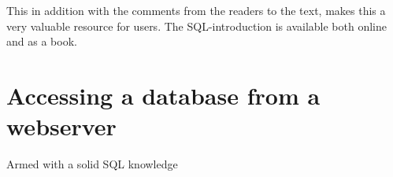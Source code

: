 This in addition with the comments from the readers to the text, makes
this a very valuable resource for users.  The SQL-introduction is
available both online and as a book.


\section{Accessing a database from a webserver}
\label{sec:accessing-a-database-from-a-webserver}

Armed with a solid SQL knowledge

